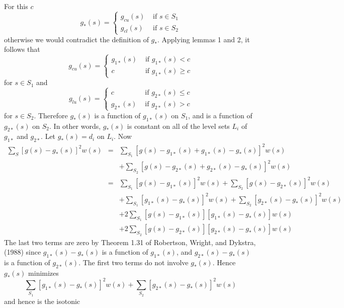 For this $c$ \begin{displaymath} g_*(s) = \left \{
\begin{array}{cl} g_{cu}(s) & \mbox{ if } s \in S_1 \\
g_{cl}(s) & \mbox{ if } s \in S_2  \end{array} \right.
\end{displaymath} otherwise we would contradict the
definition of $g_*$.  Applying lemmas 1 and 2, it follows
that \begin{displaymath} g_{cu}(s) = \left \{
\begin{array}{cl} g_{1*}(s) & \mbox{ if } g_{1*}(s) < c \\
c & \mbox{ if } g_{1*}(s) \geq c \end{array} \right.
\end{displaymath} for $s \in S_1$ and \begin{displaymath}
g_{lu}(s) = \left \{ \begin{array}{cl} c & \mbox{ if }
g_{2*}(s) \leq c \\ g_{2*}(s) & \mbox{ if } g_{2*}(s) > c
\end{array} \right.  \end{displaymath} for $s \in S_2$.
Therefore $g_*(s)$ is a function of $g_{1*}(s)$ on $S_1$,
and is a function of $g_{2*}(s)$ on $S_2$.  In other words,
$g_*(s)$ is constant on all of the level sets $L_i$ of
$g_{1*}$ and $g_{2*}$.  Let $g_*(s) = d_i$ on $L_i$.  Now
\begin{eqnarray*} \sum_S [g(s) - g_*(s)]^2w(s) & = &
\sum_{S_1} [g(s) - g_{1*}(s) + g_{1*}(s) - g_*(s)]^2w(s)\\
  & & + \sum_{S_2} [g(s) - g_{2*}(s) + g_{2*}(s) -
  g_*(s)]^2w(s)\\  & = & \sum_{S_1} [g(s) -g_{1*}(s)]^2w(s)
+ \sum_{S_2} [g(s) -g_{2*}(s)]^2w(s)\\
  & & + \sum_{S_1} [g_{1*}(s) -g_*(s)]^2w(s) + \sum_{S_2}
  [g_{2*}(s) -g_*(s)]^2w(s)\\ & & +  2 \sum_{S_1} [g(s) -
 g_{1*}(s)][g_{1*}(s) - g_*(s)]w(s)\\ & & + 2 \sum_{S_2}
 [g(s) - g_{2*}(s)][g_{2*}(s) - g_*(s)]w(s) \end{eqnarray*}
The last two terms are zero by Theorem 1.31 of
Robertson, Wright, and Dykstra, (1988) since
$g_{1*}(s) - g_*(s)$ is a function of $g_{1*}(s)$, and
$g_{2*}(s) - g_*(s)$ is a function of $g_{2*}(s)$.  The
first two terms do not involve $g_*(s)$.  Hence $g_*(s)$
minimizes \begin{equation} \sum_{S_1} [g_{1*}(s) -
g_*(s)]^2w(s) + \sum_{S_2} [g_{2*}(s) - g_*(s)]^2w(s)
\label{eq:minim} \end{equation} and hence is the isotonic
